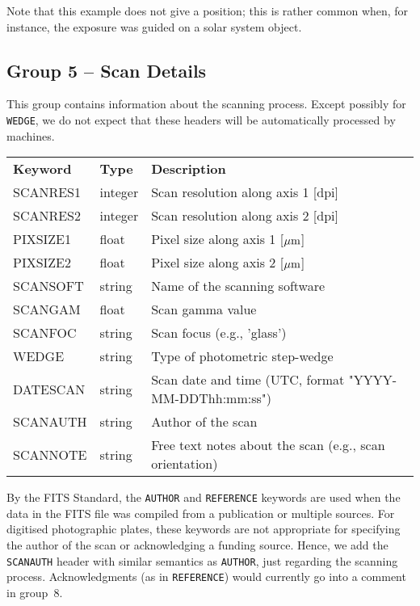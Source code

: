 \documentclass[11pt]{ivoa}
\newcommand\cardname[1]{\texttt{\color{keyword}#1}}
\begin{document}
Note that this example does not give a position; this is rather common
when, for instance, the exposure was guided on a solar system object.


\subsection{Group 5 – Scan Details}

This group contains information about the scanning process.  Except
possibly for \cardname{WEDGE}, we do not expect that these headers will
be automatically processed by machines.

\begin{inlinetable}
\footnotesize
\begin{tabular}{llp{}}
\sptablerule
\textbf{Keyword}&\textbf{Type}&\textbf{Description}\\
\sptablerule
SCANRES1 &integer &Scan resolution along axis 1 [dpi]\\
SCANRES2 &integer &Scan resolution along axis 2 [dpi]\\
PIXSIZE1 &float   &Pixel size along axis 1 [$\mu\rm m$]\\
PIXSIZE2 &float   &Pixel size along axis 2 [$\mu\rm m$]\\
SCANSOFT &string  &Name of the scanning software\\
SCANGAM  &float   &Scan gamma value\\
SCANFOC  &string  &Scan focus (e.g., 'glass')\\
WEDGE    &string  &Type of photometric step-wedge\\
DATESCAN &string  &
  Scan date and time (UTC, format "YYYY-MM-DDThh:mm:ss")\\
SCANAUTH &string  &Author of the scan\\
SCANNOTE &string  &
  Free text notes about the scan (e.g., scan orientation)\\
\end{tabular}
\end{inlinetable}


By the FITS Standard, the \cardname{AUTHOR} and \cardname{REFERENCE} 
keywords are used when the
data in the FITS file was compiled from a publication or multiple
sources. For digitised photographic plates, these keywords are not
appropriate for specifying the author of the scan or acknowledging a
funding source. Hence, we add the \cardname{SCANAUTH} header with
similar semantics as \cardname{AUTHOR}, just regarding the scanning
process.  Acknowledgments (as in \cardname{REFERENCE}) would currently
go into a comment in group~8.
\end{document}
